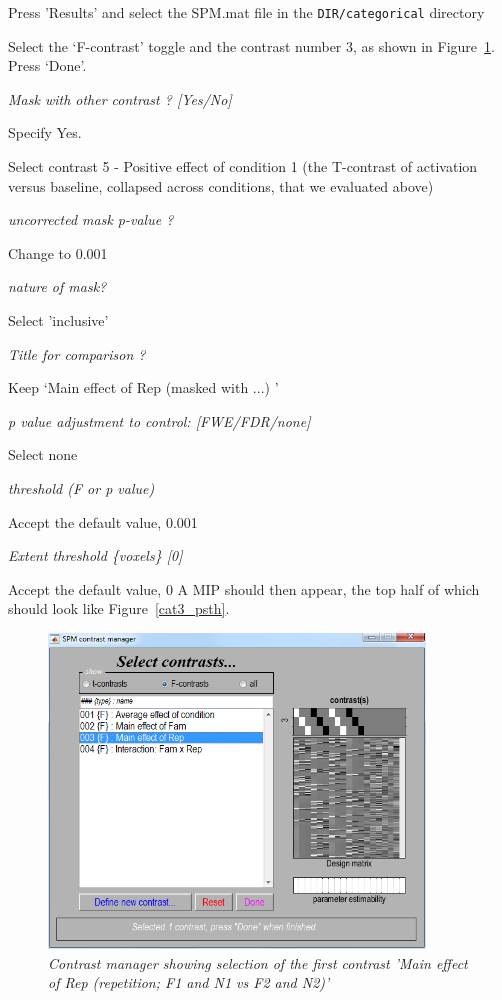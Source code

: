 \bi
\item{Press 'Results' and select the SPM.mat file in the 
\verb!DIR/categorical! directory}
\item{Select the `F-contrast' toggle and the contrast number 3, as shown in Figure~\ref{cat3_contrast}. Press `Done'.}
\item{\em Mask with other contrast ? [Yes/No]}
\item{Specify Yes.}
\item{Select contrast 5 - Positive effect of condition 1 (the T-contrast of activation versus baseline, collapsed across conditions, that we evaluated above)}
\item{\em uncorrected mask p-value ?}
\item{Change to 0.001}
\item{\em nature of mask? }
\item{Select 'inclusive'}
\item{\em Title for comparison ?}
\item{Keep `Main effect of Rep (masked with ...) '}
\item{\em p value adjustment to control: [FWE/FDR/none]}
\item{Select none}
\item{\em threshold (F or p value)}
\item{Accept the default value, 0.001}
\item{\em Extent threshold \{voxels\} [0]}
\item{Accept the default value, 0}
\ei
A MIP should then appear, the top half of which should look like Figure~\ref{cat3_psth}.
\begin{figure}
\begin{center}
\includegraphics[width=100mm]{faces/cat3_contrast}
\caption{\em Contrast manager showing selection of the first contrast 'Main effect of Rep (repetition; F1 and N1 vs F2 and N2)'\label{cat3_contrast} }
\end{center}
\end{figure}



